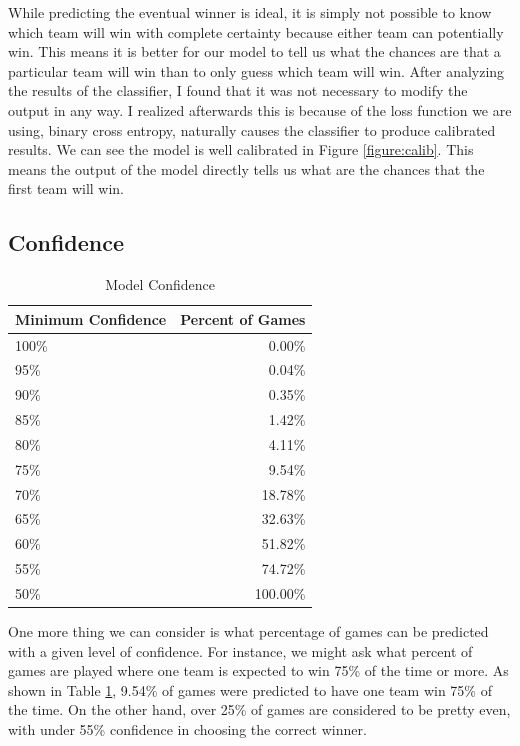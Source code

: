 \documentclass[twoside,twocolumn]{article}
\begin{document}
While predicting the eventual winner is ideal, it is simply not possible to know which team will win with complete certainty because either team can potentially win.  This means it is better for our model to tell us what the chances are that a particular team will win than to only guess which team will win.  After analyzing the results of the classifier, I found that it was not necessary to modify the output in any way.  I realized afterwards this is because of the loss function we are using, binary cross entropy, naturally causes the classifier to produce calibrated results.  We can see the model is well calibrated in Figure \ref{figure:calib}.  This means the output of the model directly tells us what are the chances that the first team will win.

\subsection{Confidence}

\begin{table}[h]
\caption{Model Confidence}
\label{table:confidence}
\centering
\begin{tabular}{lr}
\toprule
Minimum Confidence & Percent of Games \\
\midrule
100\% & 0.00\% \\
95\% & 0.04\% \\
90\% & 0.35\% \\
85\% & 1.42\% \\
80\% & 4.11\% \\
75\% & 9.54\% \\
70\% & 18.78\% \\
65\% & 32.63\% \\
60\% & 51.82\% \\
55\% & 74.72\% \\
50\% & 100.00\% \\
\bottomrule
\end{tabular}
\end{table}

One more thing we can consider is what percentage of games can be predicted with a given level of confidence.  For instance, we might ask what percent of games are played where one team is expected to win 75\% of the time or more.  As shown in Table \ref{table:confidence}, 9.54\% of games were predicted to have one team win 75\% of the time.  On the other hand, over 25\% of games are considered to be pretty even, with under 55\% confidence in choosing the correct winner.
\end{document}
